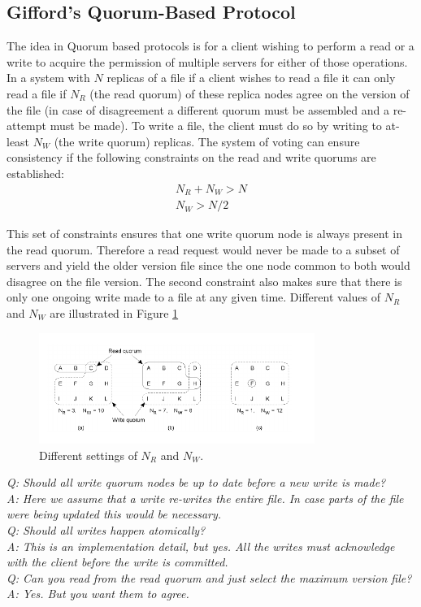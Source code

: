 \documentclass[twoside]{article}
\begin{document}
\subsection{Gifford's Quorum-Based Protocol}
The idea in Quorum based protocols is for a client wishing to perform a read or a write to acquire the permission of multiple servers for either of those operations. In a system with $N$ replicas of a file if a client wishes to read a file it can only read a file if $N_R$ (the read quorum) of these replica nodes agree on the version of the file (in case of disagreement a different quorum must be assembled and a re-attempt must be made). To write a file, the client must do so by writing to at-least $N_W$ (the write quorum) replicas. The system of voting can ensure consistency if the following constraints on the read and write quorums are established:
\begin{align}
  N_{R} + N_{W} > N\\ 
  N_{W} > N / 2
\end{align}

This set of constraints ensures that one write quorum node is always present in the read quorum. Therefore a read request would never be made to a subset of servers and yield the older version file since the one node common to both would disagree on the file version. The second constraint also makes sure that there is only one ongoing write made to a file at any given time. Different values of $N_R$ and $N_W$ are illustrated in Figure \ref{fig:voting}

\begin{figure}
\begin{center}
   \includegraphics[width=0.8\textwidth]{quorum.png}
   \caption{Different settings of $N_{R}$ and $N_{W}$.}
   \label{fig:voting}
 \end{center}
\end{figure}

\textit{Q: Should all write quorum nodes be up to date before a new write is made?\\
  A: Here we assume that a write re-writes the entire file. In case parts of the file were being updated this would be necessary.\\
  Q: Should all writes happen atomically?\\
  A: This is an implementation detail, but yes. All the writes must acknowledge with the client before the write is committed.\\
  Q: Can you read from the read quorum and just select the maximum version file?\\
  A: Yes. But you want them to agree.
}
\end{document}
